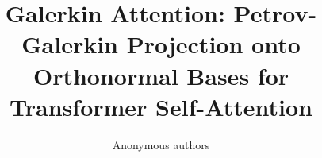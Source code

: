 \title{\textbf{Galerkin Attention: Petrov-Galerkin Projection onto Orthonormal Bases for Transformer Self-Attention}}

\author{Anonymous authors}

